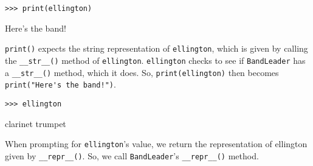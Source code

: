 \begin{blocksection}
\vspace{2\baselineskip}

\begin{lstlisting}
>>> print(ellington)
\end{lstlisting}
\begin{solution}[.2in]
Here's the band!

\lstinline{print()} expects the string representation of \lstinline{ellington}, which is given by calling the \lstinline{__str__()} method of \lstinline{ellington}. \lstinline{ellington} checks to see if \lstinline{BandLeader} has a \lstinline{__str__()} method, which it does. So, \lstinline{print(ellington)} then becomes \lstinline{print("Here's the band!")}.
\end{solution}

\vspace{2\baselineskip}
\end{blocksection}
\begin{blocksection}
\begin{lstlisting}
>>> ellington
\end{lstlisting}
\begin{solution}[.2in]
clarinet trumpet

When prompting for \lstinline{ellington}’s value, we return the representation of ellington given by \lstinline{__repr__()}. So, we call \lstinline{BandLeader}’s \lstinline{__repr__()} method.

\end{solution}

\end{blocksection}

